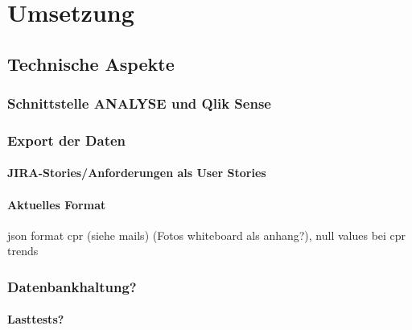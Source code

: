 \chapter{Umsetzung}
\label{kap:umsetzung}
\minitoc\pagebreak

\section{Technische Aspekte}
\subsection{Schnittstelle \acrlong*{ANALYSE} und Qlik Sense}
\subsection{Export der Daten} %
\subsubsection{JIRA-Stories/Anforderungen als User Stories}
\subsubsection{Aktuelles Format}
json format cpr (siehe mails) (Fotos whiteboard als anhang?),
null values bei cpr trends
\subsection{Datenbankhaltung?}
\subsubsection{Lasttests?}


